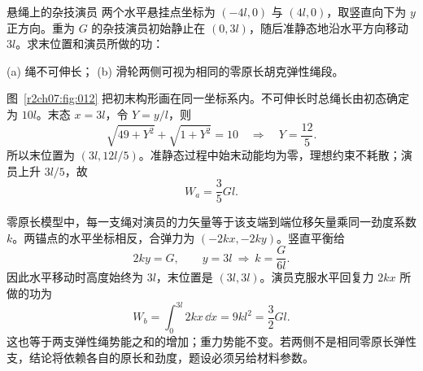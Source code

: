 \begin{practicebox}{悬绳上的杂技演员}
两个水平悬挂点坐标为 $(-4l,0)$ 与 $(4l,0)$，取竖直向下为 $y$ 正方向。重为 $G$ 的杂技演员初始静止在 $(0,3l)$，随后准静态地沿水平方向移动 $3l$。求末位置和演员所做的功：

(a) 绳不可伸长；
(b) 滑轮两侧可视为相同的零原长胡克弹性绳段。
\label{r2ch07:pr:005}
\begin{solution}
图~\ref{r2ch07:fig:012} 把初末构形画在同一坐标系内。不可伸长时总绳长由初态确定为 $10l$。末态 $x=3l$，令 $Y=y/l$，则
\begin{equation}
 \sqrt{49+Y^2}+\sqrt{1+Y^2}=10
 \quad\Longrightarrow\quad Y=\frac{12}{5}.
 \label{r2ch07:eq:036}
\end{equation}
所以末位置为 $(3l,12l/5)$。准静态过程中始末动能均为零，理想约束不耗散；演员上升 $3l/5$，故
\begin{equation}
 \boxed{W_a=\frac35Gl}.
 \label{r2ch07:eq:037}
\end{equation}

零原长模型中，每一支绳对演员的力矢量等于该支端到端位移矢量乘同一劲度系数 $k$。两锚点的水平坐标相反，合弹力为 $(-2kx,-2ky)$。竖直平衡给
\begin{equation}
 2ky=G,\qquad y=3l\ \Longrightarrow\ k=\frac{G}{6l}.
 \label{r2ch07:eq:038}
\end{equation}
因此水平移动时高度始终为 $3l$，末位置是 $(3l,3l)$。演员克服水平回复力 $2kx$ 所做的功为
\begin{equation}
 \boxed{W_b=\int_0^{3l}2kx\,\dd x=9kl^2=\frac32Gl}.
 \label{r2ch07:eq:039}
\end{equation}
这也等于两支弹性绳势能之和的增加；重力势能不变。若两侧不是相同零原长弹性支，结论将依赖各自的原长和劲度，题设必须另给材料参数。
\figAcrobat
\end{solution}
\end{practicebox}

